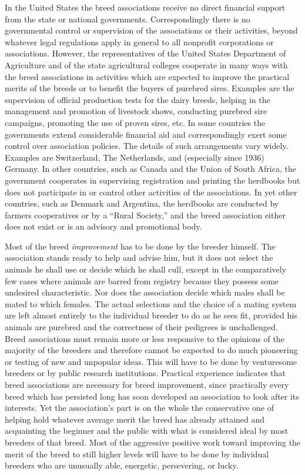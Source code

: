 In the United States the breed associations receive no direct financial support from the state or national governments. 
Correspondingly there is no governmental control or supervision of the associations or their activities, beyond whatever 
legal regulations apply in general to all nonprofit corporations or associations. However, the representatives of the 
United States Department of Agriculture and of the state agricultural colleges cooperate in many ways with the breed 
associations in activities which are expected to improve the practical merits of the breeds or to benefit the buyers of 
purebred sires. Examples are the supervision of official production tests for the dairy breeds, helping in the management 
and promotion of livestock shows, conducting purebred sire campaigns, promoting the use of proven sires, etc. In some 
countries the governments extend considerable financial aid and correspondingly exert some control over association 
policies. The details of such arrangements vary widely. Examples are Switzerland, The Netherlands, and (especially since 
1936) Germany. In other countries, such as Canada and the Union of South Africa, the government cooperates in supervising 
registration and printing the herdbooks but does not participate in or control other activities of the associations. In yet
other countries, such as Denmark and Argentina, the herdbooks are conducted by farmers cooperatives or by a ``Rural 
Society,'' and the breed association either does not exist or is an advisory and promotional body.
 
Most of the breed \textit{improvement} has to be done by the breeder himself. The association stands ready to help and 
advise him, but it does not select the animals he shall use or decide which he shall cull, except in the comparatively few 
cases where animals are barred from registry because they possess some undesired characteristic. Nor does the association
decide which males shall be mated to which females. The actual selections and the choice of a mating system are left almost 
entirely to the individual breeder to do as he sees fit, provided his animals are purebred and the correctness of their 
pedigrees is unchallenged. Breed associations must remain more or less responsive to the opinions of the majority of the 
breeders and therefore cannot be expected to do much pioneering or testing of new and unpopular ideas. This will have to be 
done by venturesome breeders or by public research institutions. Practical experience indicates that breed associations are 
necessary for breed improvement, since practically every breed which has persisted long has soon developed an association 
to look after its interests. Yet the association's part is on the whole the conservative one of helping hold whatever 
average merit the breed has already attained and acquainting the beginner and the public with what is considered ideal by 
most breeders of that breed. Most of the aggressive positive work toward improving the merit of the breed to still higher 
levels will have to be done by individual breeders who are unusually able, energetic, persevering, or lucky.

